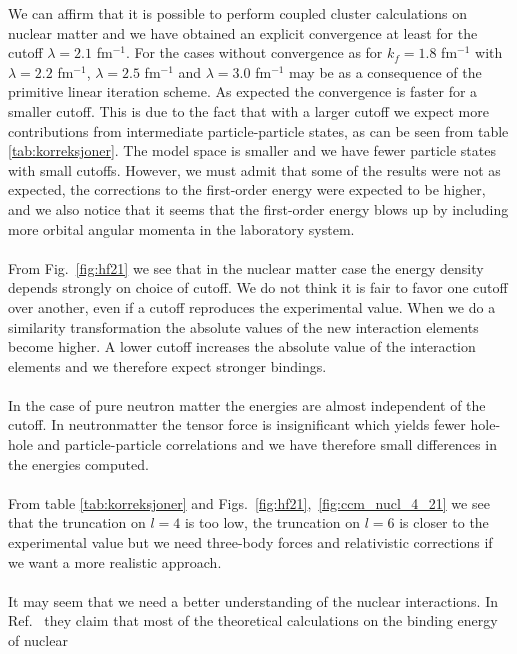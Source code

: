 We can affirm that it is possible to perform coupled cluster calculations on 
nuclear matter and we have obtained an explicit convergence at least for the cutoff 
$\lambda=2.1$ fm$^{-1}$. For the cases without convergence as for 
$k_f=1.8$ fm$^{-1}$ with $\lambda=2.2$ fm$^{-1}$, $\lambda=2.5$ fm$^{-1}$ and 
$\lambda=3.0$ fm$^{-1}$ may be as a consequence of the primitive linear iteration scheme.  
As expected the convergence is faster for a smaller cutoff. This is due to the fact that
with a larger cutoff we expect more contributions from intermediate particle-particle states, as
can be seen from table \ref{tab:korreksjoner}. The model space is smaller and we have fewer particle states with small cutoffs.
However, we must admit that some of the results were not as expected, the corrections to the
first-order energy were expected to be higher, and we also notice that it seems
that the first-order energy blows up by including more orbital angular
momenta in the laboratory system. \\
\\
From Fig.~\ref{fig:hf21} we see that in the nuclear matter case the energy density depends 
strongly 
on choice of cutoff. We do not think it is fair to favor one cutoff over another, even if a cutoff reproduces the experimental value. %
When we do a similarity transformation the absolute values of the new interaction elements become higher. A lower cutoff increases the absolute value of the interaction elements and we therefore expect stronger bindings.\\
\\
In the case of pure neutron matter the energies are almost independent of the 
cutoff. In neutronmatter the tensor force is insignificant which yields fewer 
hole-hole and particle-particle correlations and we have therefore small differences in the energies computed.\\
\\
From table \ref{tab:korreksjoner} and Figs.~\ref{fig:hf21},~\ref{fig:ccm_nucl_4_21} we see that the truncation on $l=4$ is too low, the 
truncation on $l=6$ is closer to the experimental value but we need three-body forces and relativistic corrections 
if we want a more realistic approach.\\
\\
It may seem 
that we need a better understanding of the nuclear interactions. In Ref.~\cite{inmedium} they claim that most of the theoretical calculations on the binding energy of nuclear
